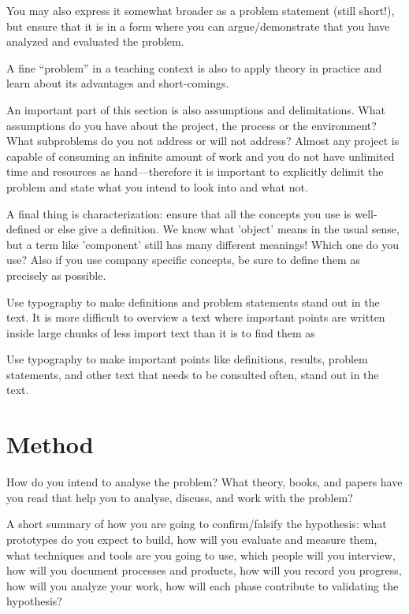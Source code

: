 \documentclass[a4paper]{article}
\newenvironment{checkit}{%
\begin{lrbox}{\definitionbox}
\begin{minipage}[t]{0.85\textwidth}%
}%
{\end{minipage}\end{lrbox}%
\begin{center}{\colorbox{checkcolor}{\usebox{\definitionbox}}}%
\end{center}}
\begin{document}
You may also express it somewhat broader as a problem statement (still
short!), but ensure that it is in a form where you can
argue/demonstrate that you have analyzed and evaluated the problem.

A fine ``problem'' in a teaching context is also to apply theory in
practice and learn about its advantages and short-comings.

An important part of this section is also assumptions and
delimitations. What assumptions do you have about the project, the
process or the environment? What subproblems do you not address or
will not address? Almost any project is capable of consuming an
infinite amount of work and you do not have unlimited time and
resources as hand---therefore it is important to explicitly delimit
the problem and state what you intend to look into and what not.

A final thing is characterization: ensure that all the concepts you
use is well-defined or else give a definition. We know what 'object'
means in the usual sense, but a term like 'component' still has many
different meanings! Which one do you use? Also if you use company
specific concepts, be sure to define them as precisely as possible.

Use typography to make definitions and problem statements stand out in
the text. It is more difficult to overview a text where important
points are written inside large chunks of less import text than it is
to find them as

\begin{checkit}
Use typography to make important points like definitions, results,
problem statements, and other text that needs to be consulted often,
stand out in the text.
\end{checkit}

\section{Method}

How do you intend to analyse the problem? What theory, books, and
papers have you read that help you to analyse, discuss, and work with
the problem?


A short summary of how you are going to confirm/falsify the
hypothesis: what prototypes do you expect to build, how will you
evaluate and measure them, what techniques and tools are you going to
use, which people will you interview, how will you document processes
and products, how will you record you progress, how will you analyze
your work, how will each phase contribute to validating the
hypothesis?
\end{document}
